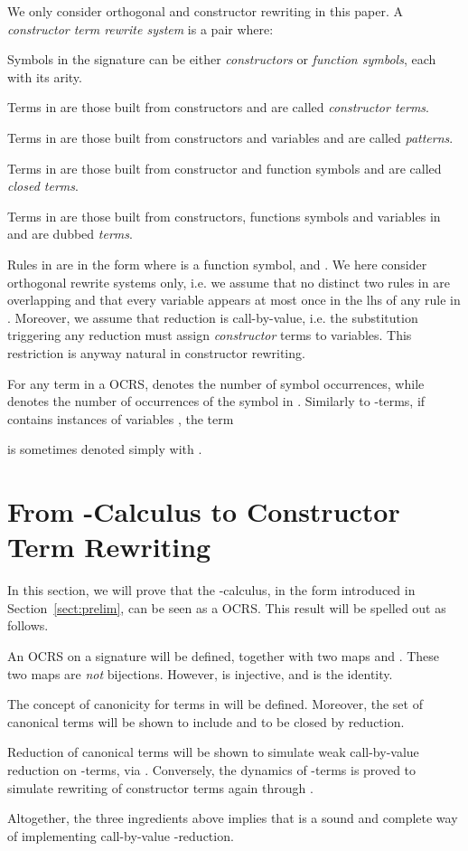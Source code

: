 \documentclass{LMCS}
\newenvironment{varitemize}
{
\begin{list}{\labelitemi}
{\setlength{\itemsep}{0.0mm}
 \setlength{\topsep}{0.0mm}
 \setlength{\parindent}{0.0mm}
 \setlength{\parskip}{0.0mm}
 \setlength{\parsep}{0.0mm}
 \setlength{\partopsep}{0.0mm}
 \setlength{\leftmargin}{15pt}
 \setlength{\labelsep}{5pt}
 \setlength{\labelwidth}{10pt}}}
{
 \end{list} 
}
\newenvironment{varitemizeii}
{
\begin{list}{\labelitemiv}
{\setlength{\itemsep}{0.0mm}
 \setlength{\topsep}{0.0mm}
 \setlength{\parindent}{0.0mm}
 \setlength{\parskip}{0.0mm}
 \setlength{\parsep}{0.0mm}
 \setlength{\partopsep}{0.0mm}
 \setlength{\leftmargin}{15pt}
 \setlength{\labelsep}{5pt}
 \setlength{\labelwidth}{10pt}}}
{
 \end{list} 
}
\newcounter{number}
\begin{document}
We only consider orthogonal and constructor rewriting in this paper.
A \emph{constructor term rewrite system} is a pair 
 where:
\begin{varitemize}
\item
  Symbols in the signature  can be either
  \emph{constructors} or \emph{function symbols}, each with its arity.
  \begin{varitemizeii} 
    \item
      Terms in  are those built
      from constructors and are called \emph{constructor terms}.
    \item
      Terms in  are those built
      from constructors and variables and are called \emph{patterns}.
    \item
      Terms in  are those built
      from constructor and function symbols and are called \emph{closed terms}.
    \item
      Terms in  are those built
      from constructors, functions symbols and variables in  and are dubbed
      \emph{terms}.
    \end{varitemizeii}
\item
  Rules in  are in the form 
  where  is a function symbol, 
  and .
  We here consider orthogonal rewrite systems only, i.e. we assume that no distinct two
  rules in  are overlapping and that every variable appears at most
  once in the lhs of any rule in . Moreover, we assume that reduction is
  call-by-value, i.e. the substitution triggering any reduction must assign
  \emph{constructor} terms to variables. This restriction is anyway natural in
  constructor rewriting.
\end{varitemize}
For any term  in a OCRS,  denotes 
the number of symbol occurrences, while  denotes
the number of occurrences of the symbol  in .
Similarly to -terms, if  contains instances of  variables
, the term 

is sometimes denoted simply with .
\section{From -Calculus to Constructor Term Rewriting}\label{sect:CRS}
In this section, we will prove that the -calculus, in the form introduced 
in Section~\ref{sect:prelim}, can be seen as a OCRS. This result will be spelled
out as follows.
\begin{varitemize}
\item
  An OCRS  on a signature  will be defined, together with two maps
   and
  .
  These two maps are \emph{not} bijections. However, 
  is injective, and  is the identity.
\item
  The concept of canonicity for terms in  will be defined. Moreover,
  the set of canonical terms will be shown to include 
  and to be closed by reduction.
\item
  Reduction of canonical terms will be shown to simulate weak call-by-value reduction
  on -terms, via . Conversely, the dynamics of
  -terms is proved to simulate rewriting of constructor terms again through
  .
\end{varitemize}
Altogether, the three ingredients above implies that  is a sound and complete
way of implementing call-by-value -reduction.
\end{document}
